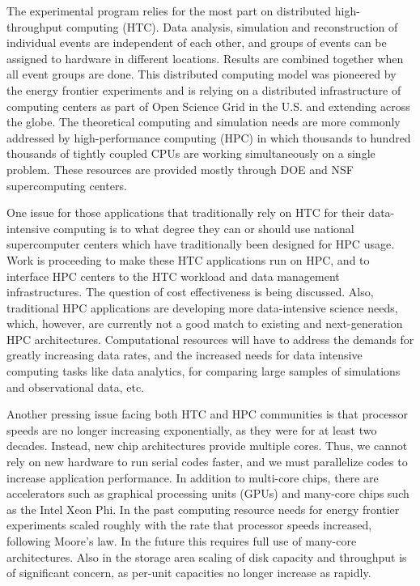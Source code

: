The experimental program relies for the most part on distributed
high-throughput computing (HTC). Data analysis, simulation and
reconstruction of individual events are independent of each other, and
groups of events can be assigned to hardware in different locations.
Results are combined together when all event groups are done. This
distributed computing model was pioneered by the energy frontier
experiments and is relying on a distributed infrastructure of computing
centers as part of Open Science Grid in the U.S. and extending across the
globe. The theoretical computing and simulation needs are more commonly
addressed by high-performance computing (HPC) in which thousands to hundred
thousands of tightly coupled CPUs are working simultaneously on a single
problem. These resources are provided mostly through DOE and NSF
supercomputing centers.

One issue for those applications that traditionally rely on HTC for their
data-intensive computing is to what degree they can or should use national
supercomputer centers which have traditionally been designed for HPC usage.
Work is proceeding to make these HTC applications run on HPC, and to
interface HPC centers to the HTC workload and data management
infrastructures. The question of cost effectiveness is being discussed.
Also, traditional HPC applications are developing more data-intensive
science needs, which, however, are currently not a good match to existing
and next-generation HPC architectures. Computational resources will have to
address the demands for greatly increasing data rates, and the increased
needs for data intensive computing tasks like data analytics, for comparing
large samples of simulations and observational data, etc.

Another pressing issue facing both HTC and HPC communities is that
processor speeds are no longer increasing exponentially, as they were for
at least two decades. Instead, new chip architectures provide multiple
cores. Thus, we cannot rely on new hardware to run serial codes faster, and
we must parallelize codes to increase application performance. In addition
to multi-core chips, there are accelerators such as graphical processing
units (GPUs) and many-core chips such as the Intel Xeon Phi. 
In the past computing resource needs for energy frontier experiments scaled
roughly with the rate that processor speeds increased, following Moore's
law. In the future this requires full use of many-core architectures. Also
in the storage area scaling of disk capacity and throughput is of
significant concern, as per-unit capacities no longer increase as rapidly.

